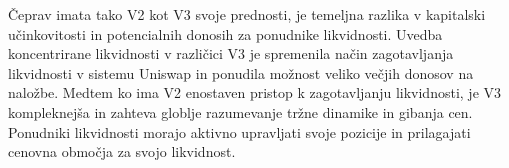 \documentclass[a4paper,12pt]{article}%
\begin{document}
Čeprav imata tako V2 kot V3 svoje prednosti, je temeljna razlika v kapitalski učinkovitosti in potencialnih donosih za ponudnike likvidnosti. Uvedba koncentrirane likvidnosti v različici V3 je spremenila način zagotavljanja likvidnosti v sistemu Uniswap in ponudila možnost veliko večjih donosov na naložbe. Medtem ko ima V2 enostaven pristop k zagotavljanju likvidnosti, je V3 kompleknejša in zahteva globlje razumevanje tržne dinamike in gibanja cen. Ponudniki likvidnosti morajo aktivno upravljati svoje pozicije in prilagajati cenovna območja za svojo likvidnost. 




\end{document}
